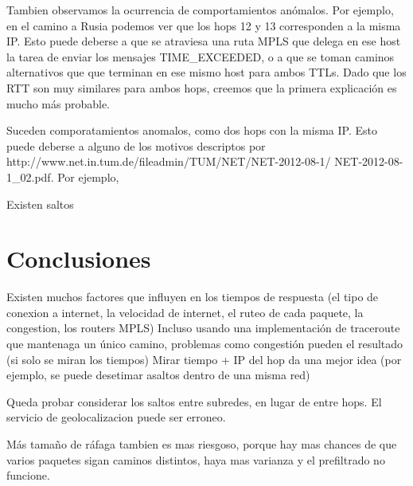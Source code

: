 Tambien observamos la ocurrencia de comportamientos anómalos. Por ejemplo, en el camino a Rusia podemos ver que los hops 12 y 13 corresponden a la misma IP. Esto puede deberse a que se atraviesa una ruta MPLS que delega en ese host la tarea de enviar los mensajes TIME_EXCEEDED, o a que se toman caminos alternativos que que terminan en ese mismo host para ambos TTLs. Dado que los RTT son muy similares para ambos hops, creemos que la primera explicación es mucho más probable.

Suceden comporatamientos anomalos, como dos hops con la misma IP. Esto puede deberse a alguno de los motivos descriptos por http://www.net.in.tum.de/fileadmin/TUM/NET/NET-2012-08-1/
NET-2012-08-1\_02.pdf. Por ejemplo, 

Existen saltos 


\section{Conclusiones}

	Existen muchos factores que influyen en los tiempos de respuesta (el tipo de conexion a internet, la velocidad de internet, el ruteo de cada paquete, la congestion, los routers MPLS)
	Incluso usando una implementación de traceroute que mantenaga un único camino, problemas como congestión pueden el resultado (si solo se miran los tiempos)
	Mirar tiempo + IP del hop da una mejor idea (por ejemplo, se puede desetimar asaltos dentro de una misma red)

	Queda probar considerar los saltos entre subredes, en lugar de entre hops.
	El servicio de geolocalizacion puede ser erroneo.
	

Más tamaño de ráfaga tambien es mas riesgoso, porque hay mas chances de que varios paquetes sigan caminos distintos, haya mas varianza y el prefiltrado no funcione.
